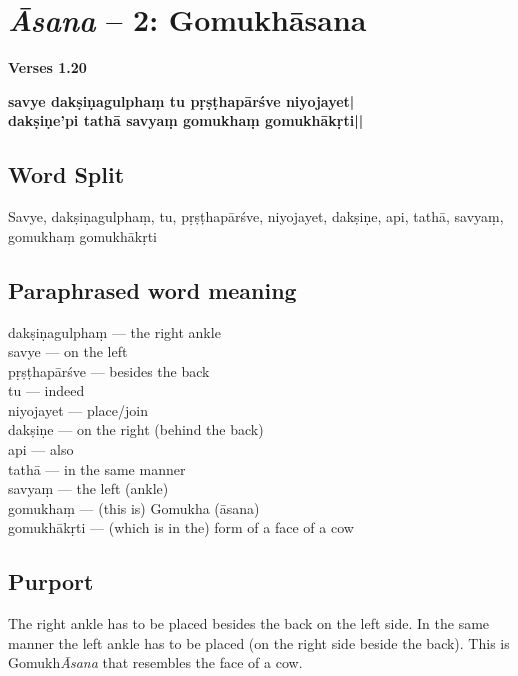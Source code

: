 \section*{\textit{Āsana} -- 2: Gomukhāsana}

\noindent \textbf{Verses 1.20}

\begin{shloka}
\textbf{savye dakṣiṇagulphaṃ tu pṛṣṭhapārśve niyojayet|}\\
\textbf{dakṣiṇe'pi tathā savyaṃ gomukhaṃ gomukhākṛti||}
\end{shloka}


\subsection*{Word Split}

Savye, dakṣiṇagulphaṃ, tu, pṛṣṭhapārśve, niyojayet, dakṣiṇe, api, tathā, savyaṃ, gomukhaṃ gomukhākṛti

\subsection*{Paraphrased word meaning}

\begin{multicols}{2}
dakṣiṇagulphaṃ --- the right ankle\\ 
savye --- on the left\\ 
pṛṣṭhapārśve --- besides the back\\ 
tu --- indeed\\ 
niyojayet --- place/join\\ 
dakṣiṇe --- on the right (behind the back)\\ 
api --- also\\
tathā --- in the same manner\\
savyaṃ --- the left (ankle)\\
gomukhaṃ --- (this is) Gomukha (āsana)\\
gomukhākṛti --- (which is in the) form of a face of a cow\\
\end{multicols}

\subsection*{Purport}

The right ankle has to be placed besides the back on the left side. In the same manner the left ankle has to be placed (on the right side beside the back). This is Gomukh\textit{Āsana} that resembles the face of a cow.

